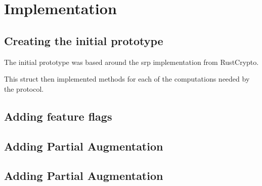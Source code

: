 \chapter{Implementation}
\label{chap:impl}

\section{Creating the initial prototype}
The initial prototype was based around the \gls{srp} implementation from RustCrypto.


This struct then implemented methods for each of the computations needed by the protocol.

\section{Adding feature flags}
\section{Adding Partial Augmentation}
\section{Adding Partial Augmentation}
